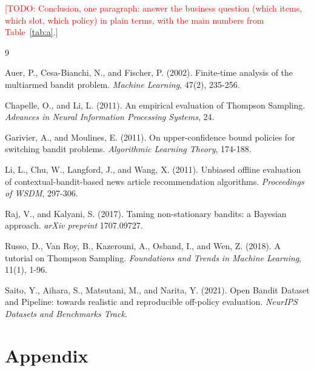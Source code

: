 \documentclass[11pt]{article}
\newcommand{\todo}[1]{\textcolor{red}{[TODO: #1]}}
\begin{document}
\todo{Conclusion, one paragraph: answer the business question (which items,
which slot, which policy) in plain terms, with the main numbers from
Table~\ref{tab:a}.}

\begin{thebibliography}{9}
\setlength{\itemsep}{2pt}
\small

Auer, P., Cesa-Bianchi, N., and Fischer, P. (2002). Finite-time analysis of the
multiarmed bandit problem. \emph{Machine Learning}, 47(2), 235-256.

Chapelle, O., and Li, L. (2011). An empirical evaluation of Thompson Sampling.
\emph{Advances in Neural Information Processing Systems}, 24.

Garivier, A., and Moulines, E. (2011). On upper-confidence bound policies for
switching bandit problems. \emph{Algorithmic Learning Theory}, 174-188.

Li, L., Chu, W., Langford, J., and Wang, X. (2011). Unbiased offline evaluation
of contextual-bandit-based news article recommendation algorithms.
\emph{Proceedings of WSDM}, 297-306.

Raj, V., and Kalyani, S. (2017). Taming non-stationary bandits: a Bayesian
approach. \emph{arXiv preprint} 1707.09727.

Russo, D., Van Roy, B., Kazerouni, A., Osband, I., and Wen, Z. (2018). A
tutorial on Thompson Sampling. \emph{Foundations and Trends in Machine
Learning}, 11(1), 1-96.

Saito, Y., Aihara, S., Matsutani, M., and Narita, Y. (2021). Open Bandit
Dataset and Pipeline: towards realistic and reproducible off-policy
evaluation. \emph{NeurIPS Datasets and Benchmarks Track}.

\end{thebibliography}

\clearpage
\appendix
\section{Appendix}
\end{document}
